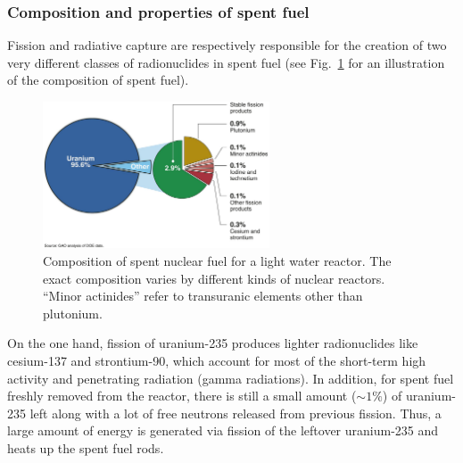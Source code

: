 \documentclass[nofootinbib,preprint,aps]{revtex4-1}
\begin{document}
        \subsubsection{Composition and properties of spent fuel}
        Fission and radiative capture are respectively responsible for the creation of two very
        different classes of radionuclides in spent fuel
        (see Fig.~\ref{fig:spentfuel} for an illustration of the composition of spent fuel).
        \begin{figure}[h]
            \centering
            \includegraphics[width=0.6\textwidth]{spent-fuel.png}
            \caption{Composition of spent nuclear fuel for a light water reactor. The exact composition varies
            by different kinds of nuclear reactors. ``Minor actinides'' refer to transuranic elements other than plutonium.\cite{gao}}
            \label{fig:spentfuel}
        \end{figure}

        On the one hand, fission of uranium-235 produces lighter radionuclides like cesium-137 and strontium-90, which
        account for most of the short-term high activity and penetrating radiation (gamma radiations).
        In addition, for spent fuel freshly removed from the reactor, there is still a small amount ($\sim 1\%$)
        of uranium-235 left along with a lot of free neutrons released from previous fission. Thus, a large amount
        of energy is generated via fission of the leftover uranium-235 and heats up the spent fuel rods.
\end{document}
